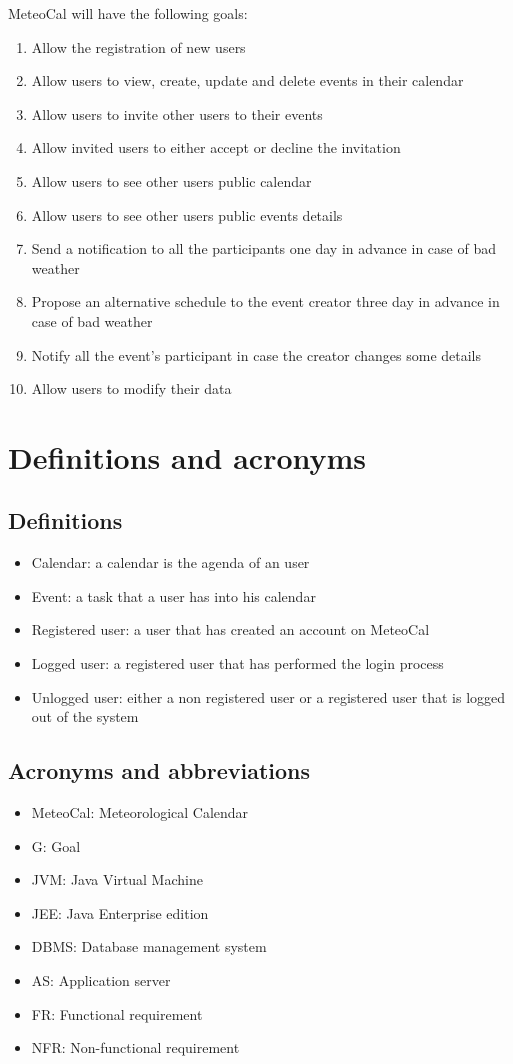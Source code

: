 \documentclass[10pt,a4paper,titlepage]{article}
\begin{document}
MeteoCal will have the following goals:
\begin{enumerate}[label = G\arabic*:]
\item Allow the registration of new users
\item Allow users to view, create, update and delete events in their calendar
\item Allow users to invite other users to their events
\item Allow invited users to either accept or decline the invitation
\item Allow users to see other users public calendar
\item Allow users to see other users public events details
\item Send a notification to all the participants one day in advance in case of bad weather
\item Propose an alternative schedule to the event creator three day in advance in case of bad weather
\item Notify all the event's participant in case the creator changes some details
\item Allow users to modify their data
\end{enumerate}
\section{Definitions and acronyms}

\subsection{Definitions}
\begin{itemize}
\item Calendar: a calendar is the agenda of an user
\item Event: a task that a user has into his calendar
\item Registered user: a user that has created an account on MeteoCal
\item Logged user: a registered user that has performed the login process
\item Unlogged user: either a non registered user or a registered user that is logged out of the system
\end{itemize}

\subsection{Acronyms and abbreviations}
\begin{itemize}
\item MeteoCal: Meteorological Calendar
\item G: Goal
\item JVM: Java Virtual Machine
\item JEE: Java Enterprise edition
\item DBMS: Database management system
\item AS: Application server
\item FR: Functional requirement
\item NFR: Non-functional requirement
\end{itemize}
\end{document}
